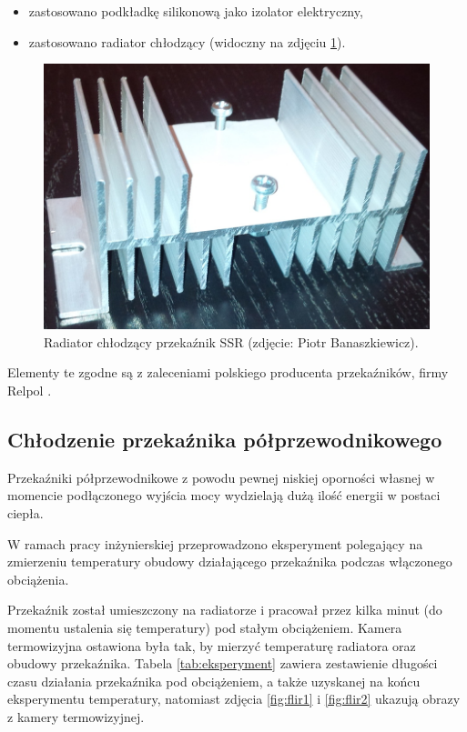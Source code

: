 \begin{itemize}
\item zastosowano podkładkę silikonową jako izolator elektryczny,
\item zastosowano radiator chłodzący (widoczny na zdjęciu \ref{fig:radiator}).
\end{itemize}

\begin{figure}[h]
	\centering
	\includegraphics[scale=0.35]{pics/radiator.jpg}
	\caption{\label{fig:radiator}Radiator chłodzący przekaźnik SSR (zdjęcie: Piotr Banaszkiewicz).}
\end{figure}

Elementy te zgodne są z zaleceniami polskiego producenta przekaźników, firmy Relpol \cite{RELPOL}.

\subsection{Chłodzenie przekaźnika półprzewodnikowego}
\label{subsec:chlodzenie_SSR}

Przekaźniki półprzewodnikowe z powodu pewnej niskiej oporności własnej w momencie podłączonego wyjścia mocy wydzielają dużą ilość energii w postaci ciepła.

W ramach pracy inżynierskiej przeprowadzono eksperyment polegający na zmierzeniu temperatury obudowy działającego przekaźnika podczas włączonego obciążenia.

Przekaźnik został umieszczony na radiatorze i pracował przez kilka minut (do momentu ustalenia się temperatury) pod stałym obciążeniem. Kamera termowizyjna ostawiona była tak, by mierzyć temperaturę radiatora oraz obudowy przekaźnika. Tabela \ref{tab:eksperyment} zawiera zestawienie długości czasu działania przekaźnika pod obciążeniem, a także uzyskanej na końcu eksperymentu temperatury, natomiast zdjęcia \ref{fig:flir1} i \ref{fig:flir2} ukazują obrazy z kamery termowizyjnej.

